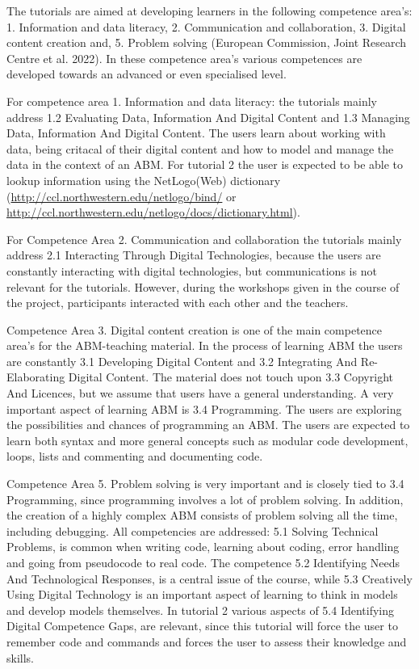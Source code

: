\documentclass[
]{article}
\begin{document}
The tutorials are aimed at developing learners in the following competence area's: 1. Information and data literacy, 2. Communication and collaboration, 3. Digital content creation and, 5. Problem solving (European Commission, Joint Research Centre et al. 2022). In these competence area's various competences are developed towards an advanced or even specialised level.

For competence area 1. Information and data literacy: the tutorials mainly address 1.2 Evaluating Data, Information And Digital Content and 1.3 Managing Data, Information And Digital Content. The users learn about working with data, being critacal of their digital content and how to model and manage the data in the context of an ABM. For tutorial 2 the user is expected to be able to lookup information using the NetLogo(Web) dictionary (\url{http://ccl.northwestern.edu/netlogo/bind/} or \url{http://ccl.northwestern.edu/netlogo/docs/dictionary.html}).

For Competence Area 2. Communication and collaboration the tutorials mainly address 2.1 Interacting Through Digital Technologies, because the users are constantly interacting with digital technologies, but communications is not relevant for the tutorials. However, during the workshops given in the course of the project, participants interacted with each other and the teachers.

Competence Area 3. Digital content creation is one of the main competence area's for the ABM-teaching material. In the process of learning ABM the users are constantly 3.1 Developing Digital Content and 3.2 Integrating And Re-Elaborating Digital Content. The material does not touch upon 3.3 Copyright And Licences, but we assume that users have a general understanding. A very important aspect of learning ABM is 3.4 Programming. The users are exploring the possibilities and chances of programming an ABM. The users are expected to learn both syntax and more general concepts such as modular code development, loops, lists and commenting and documenting code.

Competence Area 5. Problem solving is very important and is closely tied to 3.4 Programming, since programming involves a lot of problem solving. In addition, the creation of a highly complex ABM consists of problem solving all the time, including debugging. All competencies are addressed: 5.1 Solving Technical Problems, is common when writing code, learning about coding, error handling and going from pseudocode to real code. The competence 5.2 Identifying Needs And Technological Responses, is a central issue of the course, while 5.3 Creatively Using Digital Technology is an important aspect of learning to think in models and develop models themselves. In tutorial 2 various aspects of 5.4 Identifying Digital Competence Gaps, are relevant, since this tutorial will force the user to remember code and commands and forces the user to assess their knowledge and skills.
\end{document}
